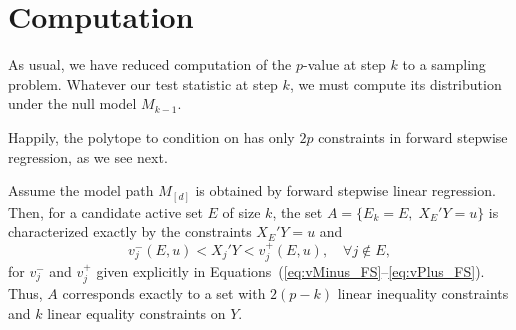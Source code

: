 \documentclass{article}
\begin{document}
\section{Computation}\label{sec:computation}

As usual, we have reduced computation of the $p$-value at step $k$ to a sampling problem. Whatever our test statistic at step $k$, we must compute its distribution under the null model $M_{k-1}$.

Happily, the polytope to condition on has only $2p$ constraints in forward stepwise regression, as we see next.

\begin{theorem}
  Assume the model path $M_{[d]}$ is obtained by forward stepwise 
  linear regression. Then, for a candidate active set $E$ of size $k$, 
  the set $A = \{E_k = E, \;X_E'Y = u\}$ is characterized 
  exactly by the constraints $X_E'Y=u$ and
  \[
  v_j^-(E,u) < X_j'Y < v_j^+(E,u), \quad\forall j \notin E,
  \]
  for $v_j^-$ and $v_j^+$ given explicitly in
  Equations~(\ref{eq:vMinus_FS}--\ref{eq:vPlus_FS}).
  Thus, $A$ corresponds exactly to 
  a set with $2(p-k)$ linear inequality constraints and $k$
  linear equality constraints on $Y$.
\end{theorem}
\end{document}
